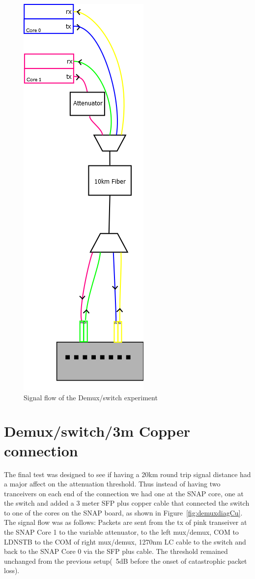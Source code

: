 \documentclass{article}
\begin{document}
\begin{figure}[h!]

	\centering
	\includegraphics[width=.3\linewidth]{muxswitch080415.png}
	\caption{Signal flow of the Demux/switch experiment}
	\label{fig:demuxdiag}
\end{figure}



\section*{Demux/switch/3m Copper connection}

The final test was designed to see if having a 20km round trip signal distance had a major affect on the attenuation threshold. Thus instead of having two tranceivers on each end of the connection we had one at the SNAP core, one at the switch and  added a 3 meter SFP plus copper cable that connected the switch to one of the cores on the SNAP board, as shown in Figure~\ref{fig:demuxdiagCu}. The signal flow was as follows: Packets are sent from the tx of pink transeiver at the SNAP Core 1 to the variable attenuator, to the left mux/demux, COM to LDNSTB to the COM of right mux/demux, 1270nm LC cable to the switch and back to the SNAP Core 0 via the SFP plus cable. The threshold remained unchanged from the previous setup(~5dB before the onset of catastrophic packet loss). 
\end{document}
